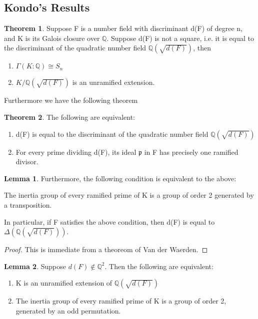 \documentclass[12pt]{extarticle}
\newcommand{\<}{\langle}
\renewcommand{\>}{\rangle}
\theoremstyle{definition}
\newtheorem{theorem}{Theorem}
\newtheorem{lemma}{Lemma}
\begin{document}
\subsection{Kondo's Results}
\begin{theorem}
    Suppose F is a number field with discriminant d(F) of degree n, and K is its Galois closure over $\mathbb{Q}$. Suppose d(F) is not a square, i.e. it is equal to the discriminant of the quadratic number field $\mathbb{Q}(\sqrt{d(F)})$, then \begin{enumerate}
        \item $\Gamma(K:\mathbb{Q})\cong S_n$
        \item $K/\mathbb{Q}(\sqrt{d(F)})$ is an unramified extension.
    \end{enumerate}
\end{theorem}
Furthermore we have the following theorem \begin{theorem}
    The following are equivalent: \begin{enumerate}
        \item d(F) is equal to the discriminant of the quadratic number field $\mathbb{Q}(\sqrt{d(F)})$
        \item For every prime dividing d(F), its ideal $\mathfrak{p}$ in F has precisely one ramified divisor.
    \end{enumerate}
\end{theorem}
\begin{lemma}
Furthermore, the following condition is equivalent to the above:
\par
    The inertia group of every ramified prime of K is a group of order 2 generated by a transposition.\par
In particular, if F satisfies the above condition, then d(F) is equal to $\Delta(\mathbb{Q}(\sqrt{d(F)}))$.
\end{lemma}
\begin{proof}
This is immediate from a theoreom of Van der Waerden. 
\end{proof}
\begin{lemma}
Suppose $d(F)\notin \mathbb{Q}^2$. Then the following are equivalent:\begin{enumerate}
    \item K is an unramified extension of $\mathbb{Q}(\sqrt{d(F)})$
    \item The inertia group of every ramified prime of K is a group of order 2, generated by an odd permutation. 
\end{enumerate}
\end{lemma} 
\end{document}
